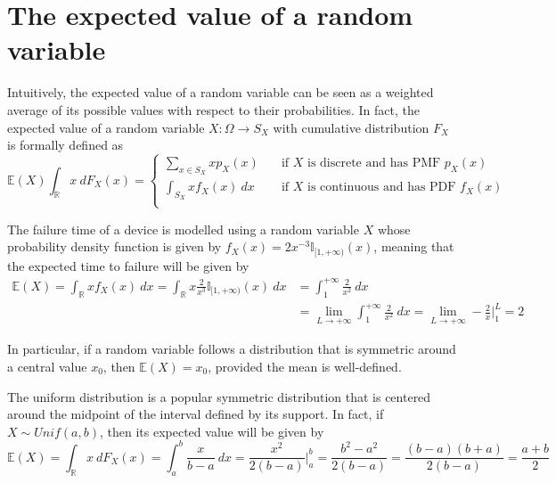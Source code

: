 \documentclass{report}
\begin{document}
\section{The expected value of a random variable}
Intuitively, the expected value of a random variable can be seen as a weighted average of its possible values with respect to their probabilities. \newline
In fact, the expected value of a random variable $\displaystyle X: \Omega \to S_X$ with cumulative distribution $\displaystyle F_X$ is formally defined as
\[\mathbb{E}(X) \int_{\mathbb{R}} x \ dF_X(x) = \begin{cases}
    \sum_{x \in S_X} xp_X(x) &\quad\text{if $X$ is discrete and has PMF $p_X(x)$} \\
    \int_{S_X} xf_X(x) \ dx &\quad\text{if $X$ is continuous and has PDF $f_X(x)$} \\
\end{cases}\]
\begin{examplebox}
    The failure time of a device is modelled using a random variable $\displaystyle X$ whose probability density function is given by $\displaystyle f_X(x) = 2x^{-3}\mathbb{I}_{[1, +\infty)}(x)$, meaning that the expected time to failure will be given by
    \begin{align*}
        \mathbb{E}(X) = \int_{\mathbb{R}} xf_X(x) \ dx = \int_{\mathbb{R}} x\frac{2}{x^3}\mathbb{I}_{[1, +\infty)}(x) \ dx
            &= \int_1^{+\infty} \frac{2}{x^2} \ dx \\
            &= \lim_{L \to +\infty} \int_1^{+\infty} \frac{2}{x^2} \ dx = \lim_{L \to +\infty} -\frac{2}{x}\Bigg|_1^L = 2
    \end{align*}
\end{examplebox}
\noindent In particular, if a random variable follows a distribution that is symmetric around a central value $\displaystyle x_0$, then $\displaystyle \mathbb{E}(X) = x_0$, provided the mean is well-defined.
\begin{examplebox}
    The uniform distribution is a popular symmetric distribution that is centered around the midpoint of the interval defined by its support. \newline
    In fact, if $\displaystyle X \sim Unif(a, b)$, then its expected value will be given by
    \[\mathbb{E}(X) = \int_{\mathbb{R}} x \ dF_X(x) = \int_a^b \frac{x}{b - a} \ dx = \frac{x^2}{2(b - a)}\Bigg|_a^b = \frac{b^2 - a^2}{2(b - a)} = \frac{(b - a)(b + a)}{2(b - a)} = \frac{a + b}{2}\]
\end{examplebox}
\end{document}
